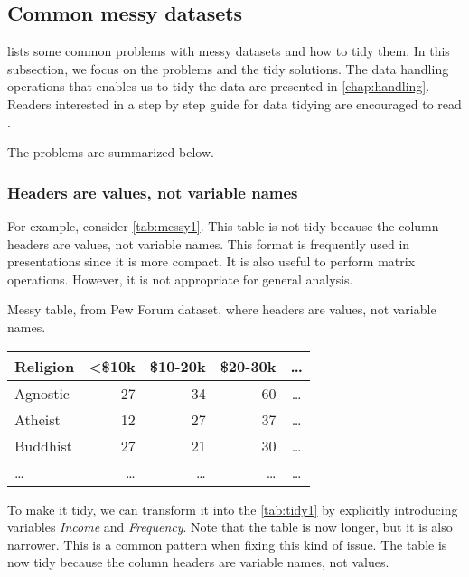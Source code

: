 \subsection{Common messy datasets}
\label{sub:messy}

\textcite{Wickham2014} lists some common problems with messy
datasets and how to tidy them.  In this subsection, we focus on the problems and the
tidy solutions.  The data handling operations that enables us to tidy the data are
presented in \cref{chap:handling}.  Readers interested in a step by step guide for data
tidying are encouraged to read \textcite{Wickham2023}.

The problems are summarized below.

\clearpage
\subsubsection{Headers are values, not variable names}  For example, consider
\cref{tab:messy1}.  This table is not tidy because the column headers are values, not
variable names.  This format is frequently used in presentations since it is more compact.
It is also useful to perform matrix operations. However, it is not appropriate for general
analysis.

\begin{tablebox}[label=tab:messy1]{Messy table, from Pew Forum dataset, where headers are values, not variable names.}
  \centering
  \begin{tabular}{l r r r c}
    \toprule
    \textbf{Religion} & \textbf{<\$10k} & \textbf{\$10-20k} & \textbf{\$20-30k} & \textbf{\dots} \\
    \midrule
    Agnostic & 27 & 34 & 60 & \dots \\
    Atheist & 12 & 27 & 37 & \dots \\
    Buddhist & 27 & 21 & 30 & \dots \\
    \dots & \dots & \dots & \dots & \dots \\
    \bottomrule
  \end{tabular}
\end{tablebox}

To make it tidy, we can transform it into the \cref{tab:tidy1} by explicitly introducing
variables \emph{Income} and \emph{Frequency}.
Note that the table is now longer, but it is also narrower.  This is a common pattern when
fixing this kind of issue.  The table is now tidy because the column headers are variable
names, not values.


